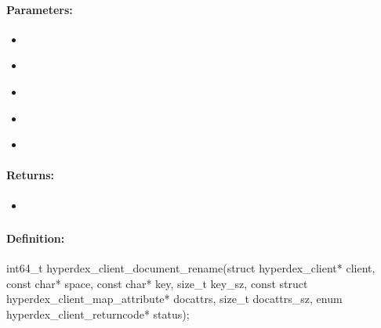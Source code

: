 \paragraph{Parameters:}
\begin{itemize}[noitemsep]
\item {}\\

\item {}\\

\item {}\\

\item {}\\

\item {}\\

\end{itemize}

\paragraph{Returns:}
\begin{itemize}[noitemsep]
\item {}\\

\end{itemize}

\pagebreak
\subsubsection{}
\label{api:c:document_rename}


\paragraph{Definition:}
\begin{ccode}
int64_t hyperdex_client_document_rename(struct hyperdex_client* client,
        const char* space,
        const char* key, size_t key_sz,
        const struct hyperdex_client_map_attribute* docattrs, size_t docattrs_sz,
        enum hyperdex_client_returncode* status);
\end{ccode}

